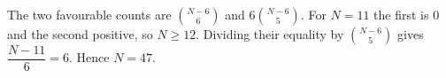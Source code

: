 The two favourable counts are $\binom{N-6}{6}$ and $6\binom{N-6}{5}$. For $N=11$ the first is 0 and the second positive, so $N\ge12$. Dividing their equality by $\binom{N-6}{5}$ gives $\dfrac{N-11}{6}=6$. Hence $\boxed{N=47}$.
